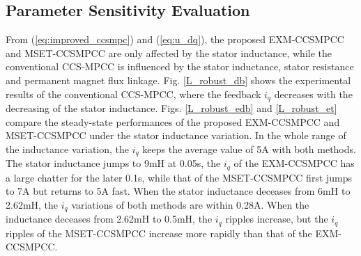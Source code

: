 \documentclass[a4paper, 8pt, twocolumn]{IEEEtran}
\begin{document}
\subsection{Parameter Sensitivity Evaluation}
From (\ref{eq:improved_ccsmpc}) and (\ref{eq:u_dq}), the proposed EXM-CCSMPCC and MSET-CCSMPCC are only affected by the stator inductance, while the conventional CCS-MPCC is influenced by the stator inductance, stator resistance and permanent magnet flux linkage. Fig. \ref{L_robust_db} shows the experimental results of the conventional CCS-MPCC, where the feedback $i_q$ decreases with the decreasing of the stator inductance. Figs. \ref{L_robust_edb} and \ref{L_robust_et} compare the steady-state performances of the proposed EXM-CCSMPCC and MSET-CCSMPCC under the stator inductance variation. In the whole range of the inductance variation, the $i_q$ keeps the average value of 5A with both methods. The stator inductance jumps to 9mH at 0.05s, the $i_q$ of the EXM-CCSMPCC has a large chatter for the later 0.1s, while that of the MSET-CCSMPCC first jumps to 7A but returns to 5A fast. When the stator inductance deceases from 6mH to 2.62mH, the $i_q$ variations of both methods are within 0.28A. When the inductance deceases from 2.62mH to 0.5mH, the $i_q$ ripples increase, but the $i_q$ ripples of the MSET-CCSMPCC increase more rapidly than that of the EXM-CCSMPCC.
\end{document}
